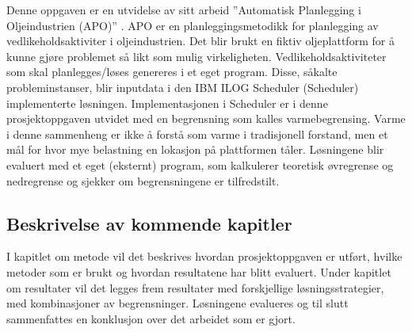 Denne oppgaven er en utvidelse av \bht sitt arbeid ''Automatisk Planlegging i Oljeindustrien (APO)'' \cite{tvedtbezem}. APO er en planleggingsmetodikk for planlegging av vedlikeholdsaktiviter i oljeindustrien. Det blir brukt en fiktiv oljeplattform for å kunne gjøre problemet så likt som mulig virkeligheten. Vedlikeholdsaktiviteter som skal planlegges/løses genereres i et eget program. Disse, såkalte probleminstanser, blir inputdata i den IBM ILOG Scheduler (Scheduler) implementerte løsningen. Implementasjonen i Scheduler er i denne prosjektoppgaven utvidet med en begrensning som kalles varmebegrensing. Varme i denne sammenheng er ikke å forstå som varme i tradisjonell forstand, men et mål for hvor mye belastning en lokasjon på plattformen tåler. Løsningene blir evaluert med et eget (eksternt) program, som kalkulerer teoretisk øvregrense og nedregrense og sjekker om begrensningene er tilfredstilt.

\subsection{Beskrivelse av kommende kapitler}
I kapitlet om metode vil det beskrives hvordan prosjektoppgaven er utført, hvilke metoder som er brukt og hvordan resultatene har blitt evaluert. Under kapitlet om resultater vil det legges frem resultater med forskjellige løsningsstrategier, med kombinasjoner av begrensninger. Løsningene evalueres og til slutt sammenfattes en konklusjon over det arbeidet som er gjort.